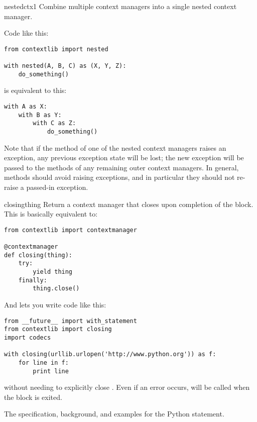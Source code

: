 \begin{funcdesc}{nested}{ctx1}
Combine multiple context managers into a single nested context manager.

Code like this:

\begin{verbatim}
from contextlib import nested

with nested(A, B, C) as (X, Y, Z):
    do_something()
\end{verbatim}

is equivalent to this:

\begin{verbatim}
with A as X:
    with B as Y:
        with C as Z:
            do_something()
\end{verbatim}

Note that if the  method of one of the nested context managers
raises an exception, any previous exception state will be lost; the new
exception will be passed to the  methods of any remaining
outer context managers.  In general,  methods should avoid
raising exceptions, and in particular they should not re-raise a
passed-in exception.
\end{funcdesc}

\label{context-closing}
\begin{funcdesc}{closing}{thing}
Return a context manager that closes  upon completion of the
block.  This is basically equivalent to:

\begin{verbatim}
from contextlib import contextmanager

@contextmanager
def closing(thing):
    try:
        yield thing
    finally:
        thing.close()
\end{verbatim}

And lets you write code like this:
\begin{verbatim}
from __future__ import with_statement
from contextlib import closing
import codecs

with closing(urllib.urlopen('http://www.python.org')) as f:
    for line in f:
        print line
\end{verbatim}

without needing to explicitly close .  Even if an error occurs,
 will be called when the  block is exited.

\end{funcdesc}

\begin{seealso}
         {The specification, background, and examples for the
          Python  statement.}
\end{seealso}
